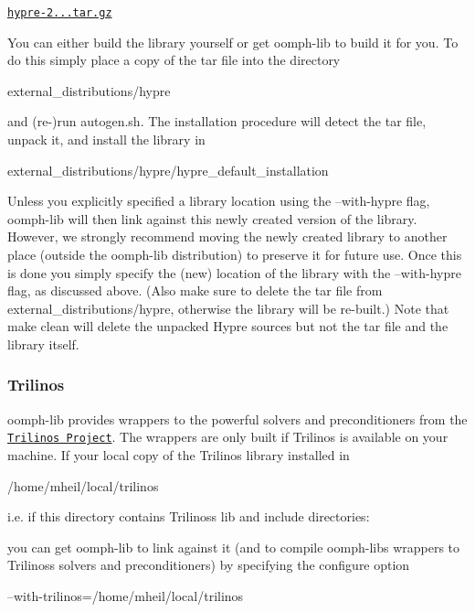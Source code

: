 \begin{center} \href{../../../../oomph-lib_external_distfiles/hypre-2.0.0.tar.gz}{\tt hypre-\/2...\+tar.\+gz} \end{center} 

You can either build the library yourself or get {\ttfamily oomph-\/lib} to build it for you. To do this simply place a copy of the tar file into the directory 
\begin{DoxyCode}
external\_distributions/hypre
\end{DoxyCode}
 and (re-\/)run {\ttfamily autogen.\+sh}. The installation procedure will detect the tar file, unpack it, and install the library in 
\begin{DoxyCode}
external\_distributions/hypre/hypre\_default\_installation
\end{DoxyCode}
 Unless you explicitly specified a library location using the {\ttfamily --with-\/hypre} flag, {\ttfamily oomph-\/lib} will then link against this newly created version of the library. However, we strongly recommend moving the newly created library to another place (outside the {\ttfamily oomph-\/lib} distribution) to preserve it for future use. Once this is done you simply specify the (new) location of the library with the {\ttfamily --with-\/hypre} flag, as discussed above. (Also make sure to delete the tar file from {\ttfamily external\+\_\+distributions/hypre}, otherwise the library will be re-\/built.) Note that {\ttfamily make} {\ttfamily clean} will delete the unpacked {\ttfamily Hypre} sources but not the tar file and the library itself.\hypertarget{index_trilinos}{}\subsubsection{Trilinos}\label{index_trilinos}
{\ttfamily oomph-\/lib} provides wrappers to the powerful solvers and preconditioners from the \href{http://trilinos.sandia.gov/}{\tt Trilinos Project}. The wrappers are only built if {\ttfamily Trilinos} is available on your machine. If your local copy of the {\ttfamily Trilinos} library installed in 
\begin{DoxyCode}
/home/mheil/local/trilinos
\end{DoxyCode}
 i.\+e. if this directory contains {\ttfamily Trilinos\textquotesingle{}s} lib and include directories\+: 
 you can get {\ttfamily oomph-\/lib} to link against it (and to compile {\ttfamily oomph-\/lib\textquotesingle{}s} wrappers to {\ttfamily Trilinos\textquotesingle{}s} solvers and preconditioners) by specifying the configure option 
\begin{DoxyCode}
--with-trilinos=/home/mheil/local/trilinos
\end{DoxyCode}


